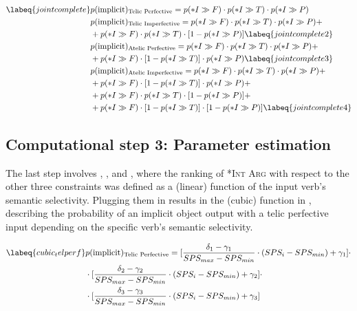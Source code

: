 \begin{align}  \labeq{jointcomplete}
    & p(\text{implicit})\textsubscript{Telic Perfective} = p(*I \gg F) \cdot p(*I \gg T) \cdot p(*I \gg P) \\
    & p(\text{implicit})\textsubscript{Telic Imperfective} = p(*I \gg F) \cdot p(*I \gg T) \cdot p(*I \gg P) + \nonumber \\ & + p(*I \gg F) \cdot p(*I \gg T) \cdot [1 - p(*I \gg P)] \labeq{jointcomplete2}\\
    & p(\text{implicit})\textsubscript{Atelic Perfective} = p(*I \gg F) \cdot p(*I \gg T) \cdot p(*I \gg P) + \nonumber \\ & + p(*I \gg F) \cdot [1 - p(*I \gg T)] \cdot p(*I \gg P) \labeq{jointcomplete3}\\
    & p(\text{implicit})\textsubscript{Atelic Imperfective} = p(*I \gg F) \cdot p(*I \gg T) \cdot p(*I \gg P) + \nonumber \\ & + p(*I \gg F) \cdot [1 - p(*I \gg T)] \cdot p(*I \gg P) + \nonumber \\ & + p(*I \gg F) \cdot p(*I \gg T) \cdot [1 - p(*I \gg P)] + \nonumber \\ & + p(*I \gg F) \cdot [1 - p(*I \gg T)] \cdot [1 - p(*I \gg P)] \labeq{jointcomplete4}
\end{align}

\subsection{Computational step 3: Parameter estimation} The last step involves , , and , where the ranking of \textsc{*Int Arg} with respect to the other three constraints was defined as a (linear) function of the input verb's semantic selectivity. Plugging them in  results in the (cubic) function in , describing the probability of an implicit object output with a telic perfective input depending on the specific verb's semantic selectivity.

\begin{align}  \labeq{cubic_telperf}
    & p(\text{implicit})\textsubscript{Telic Perfective} = [\frac{\delta_1 - \gamma_1}{SPS_{max} - SPS_{min}} \cdot ({SPS_{i} - SPS_{min}}) + \gamma_1] \cdot \nonumber \\ & \cdot [\frac{\delta_2 - \gamma_2}{SPS_{max} - SPS_{min}} \cdot ({SPS_{i} - SPS_{min}}) + \gamma_2] \cdot \nonumber \\ & \cdot [\frac{\delta_3 - \gamma_3}{SPS_{max} - SPS_{min}} \cdot ({SPS_{i} - SPS_{min}}) + \gamma_3]
\end{align}

